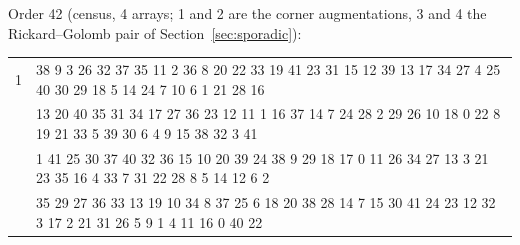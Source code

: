 \documentclass[11pt]{article}
\begin{document}
\vspace{2.5em}

\noindent Order 42 (census, 4 arrays; 1 and 2 are the corner augmentations, 3 and 4 the Rickard--Golomb pair of Section~\ref{sec:sporadic}):\par\nopagebreak
\begingroup\small
\noindent\begin{tabular}{@{}r@{\hskip 8pt}>{\ttfamily\raggedright\arraybackslash}p{}@{}}
\toprule
1 & 0 38 9 3 26 32 37 35 11 2 36 8 20 22 33 19 41 23 31 15 12 39 13 17 34 27 4 25 40 30 29 18 5 14 24 7 10 6 1 21 28 16\\
\addlinespace
2 & 25 13 20 40 35 31 34 17 27 36 23 12 11 1 16 37 14 7 24 28 2 29 26 10 18 0 22 8 19 21 33 5 39 30 6 4 9 15 38 32 3 41\\
\addlinespace
3 & 19 1 41 25 30 37 40 32 36 15 10 20 39 24 38 9 29 18 17 0 11 26 34 27 13 3 21 23 35 16 4 33 7 31 22 28 8 5 14 12 6 2\\
\addlinespace
4 & 39 35 29 27 36 33 13 19 10 34 8 37 25 6 18 20 38 28 14 7 15 30 41 24 23 12 32 3 17 2 21 31 26 5 9 1 4 11 16 0 40 22\\
\bottomrule
\end{tabular}
\endgroup




\end{document}
